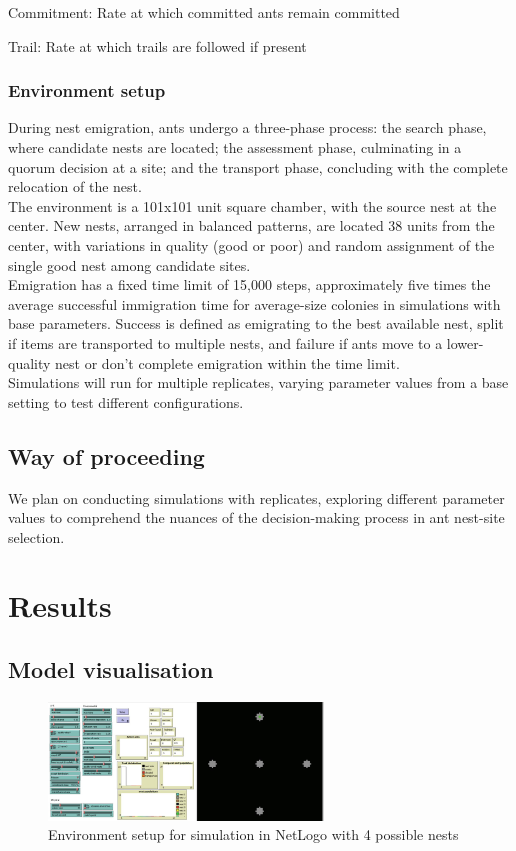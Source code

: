 \documentclass{article}
\begin{document}
Commitment: Rate at which committed ants remain committed

Trail: Rate at which trails are followed if present


\subsubsection{Environment setup}
During nest emigration, ants undergo a three-phase process: the search phase, where candidate nests are located; the assessment phase, culminating in a quorum decision at a site; and the transport phase, concluding with the complete relocation of the nest.\\
The environment is a 101x101 unit square chamber, with the source nest at the center. New nests, arranged in balanced patterns, are located 38 units from the center, with variations in quality (good or poor) and random assignment of the single good nest among candidate sites.\\
Emigration has a fixed time limit of 15,000 steps, approximately five times the average successful immigration time for average-size colonies in simulations with base parameters. Success is defined as emigrating to the best available nest, split if items are transported to multiple nests, and failure if ants move to a lower-quality nest or don't complete emigration within the time limit.\\
Simulations will run for multiple replicates, varying parameter values from a base setting to test different configurations.


\subsection{Way of proceeding}
We plan on conducting simulations with replicates, exploring different parameter values to comprehend the nuances of the decision-making process in ant nest-site selection.


\section{Results}
\subsection{Model visualisation}

\begin{figure}[h]
    \centering
    \includegraphics[width=0.65\textwidth]{Images/im1.jpeg}
    \caption{Environment setup for simulation in NetLogo with 4 possible nests}
    \label{fig:b11}
\end{figure}
\end{document}
